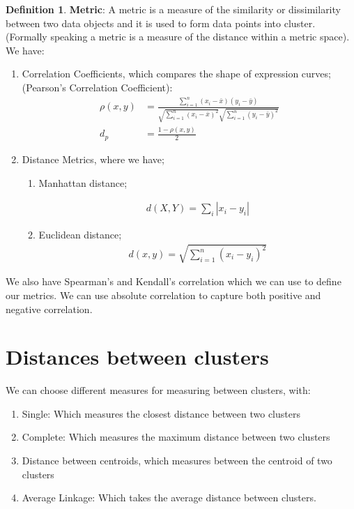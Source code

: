 \documentclass[twoside]{article}
\theoremstyle{definition}
\theoremstyle{definition}
\newtheorem*{proof1}{Definition}
\newenvironment{ddef}{\begin{dBox}\begin{proof1}}{\hfill{\scriptsize}\end{proof1}\end{dBox}}
\begin{document}
\begin{ddef}
	\textbf{Metric}: A metric is a measure of the similarity or dissimilarity between two data objects and it is used to form data points into cluster. (Formally speaking a metric is a measure of the distance within a metric space). We have:

	\begin{enumerate}
		\item Correlation Coefficients, which compares the shape of expression curves; (Pearson's Correlation Coefficient):
			\begin{align}
				\rho(x,y) & = \frac{\sum^n_{i=1}(x_i-\bar{x})(y_i-\bar{y})}{\sqrt{\sum^n_{i=1}(x_i-\bar{x})^2}\sqrt{\sum^n_{i=1}(y_i-\bar{y})^2}}\\
				d_p & = \frac{1-\rho(x,y)}{2}
			\end{align}
		\item Distance Metrics, where we have; 
			\begin{enumerate}
				\item Manhattan distance;

					\begin{align*}
						d(X,Y) = \sum_i|x_i - y_i|
					\end{align*}
				\item Euclidean distance;
					\begin{align*}
					d(x,y) = \sqrt{\sum^n_{i=1} (x_i - y_i)^2}
				\end{align*}
			\end{enumerate}

	\end{enumerate}
	We also have Spearman's and Kendall's correlation which we can use to define our metrics. We can use absolute correlation to capture both positive and negative correlation. 
\end{ddef}
\section{Distances between clusters}
We can choose different measures for measuring between clusters, with:
\begin{enumerate}
	\item Single: Which measures the closest distance between two clusters
	\item Complete: Which measures the maximum distance between two clusters
	\item Distance between centroids, which measures between the centroid of two clusters
	\item Average Linkage: Which takes the average distance between clusters. 
\end{enumerate}
\end{document}
